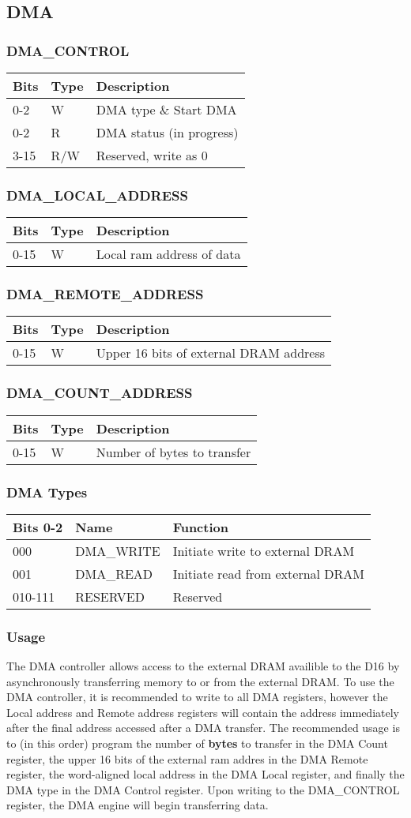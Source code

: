 \documentclass{article}
\newcommand{\regdesc}[2]{
  \subsubsection{#1}
  \begin{tabular}{|l|l|l|}
    \hline
    Bits & Type & Description \\ \hline
    #2
  \end{tabular}
}
\begin{document}
        \subsection{DMA}
        \regdesc{DMA\_CONTROL}{
          0-2 & W & DMA type \& Start DMA \\ \hline
          0-2 & R & DMA status (in progress) \\ \hline
          3-15 & R/W & Reserved, write as 0 \\ \hline
        }
        \regdesc{DMA\_LOCAL\_ADDRESS}{
          0-15 & W & Local ram address of data \\ \hline
        }
        \regdesc{DMA\_REMOTE\_ADDRESS}{
          0-15 & W & Upper 16 bits of external DRAM address\\ \hline
        }
        \regdesc{DMA\_COUNT\_ADDRESS}{
          0-15 & W & Number of bytes to transfer \\ \hline
        }
        \subsubsection{DMA Types}
        \begin{tabular}{|l|l|l|}
          \hline
          Bits 0-2 & Name & Function \\ \hline
          000 & DMA\_WRITE & Initiate write to external DRAM \\ \hline
          001 & DMA\_READ & Initiate read from external DRAM \\ \hline
          010-111 & RESERVED & Reserved \\ \hline
        \end{tabular}
        \subsubsection{Usage}
        The DMA controller allows access to the external DRAM
        availible to the D16 by asynchronously transferring memory to
        or from the external DRAM.  To use the DMA controller, it is
        recommended to write to all DMA registers, however the Local
        address and Remote address registers will contain the address
        immediately after the final address accessed after a DMA
        transfer. The recommended usage is to (in this order) program
        the number of \textbf{bytes} to transfer in the DMA Count
        register, the upper 16 bits of the external ram addres in the
        DMA Remote register, the word-aligned local address in the DMA
        Local register, and finally the DMA type in the DMA Control
        register. Upon writing to the DMA\_CONTROL register, the DMA
        engine will begin transferring data.
        
        
\end{document}
